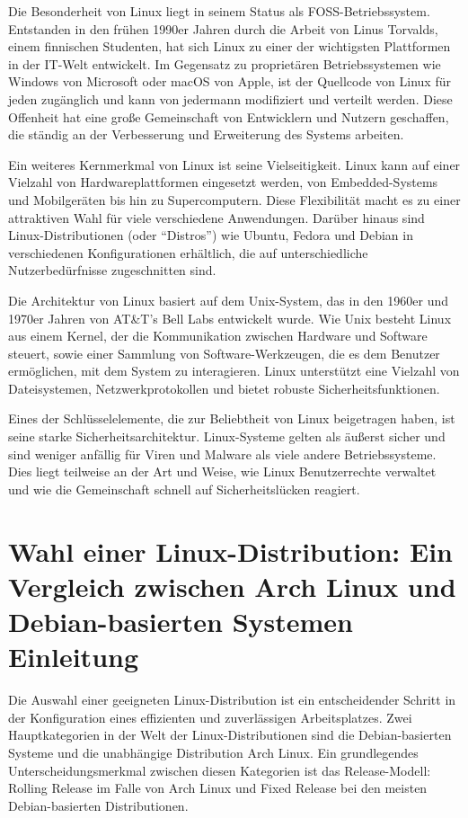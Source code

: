 Die Besonderheit von Linux liegt in seinem Status als
\Gls{FOSS}-Betriebssystem. Entstanden in den frühen 1990er Jahren durch die
Arbeit von Linus Torvalds, einem finnischen Studenten, hat sich Linux zu einer
der wichtigsten Plattformen in der IT-Welt entwickelt. Im Gegensatz zu
proprietären Betriebssystemen wie Windows von Microsoft oder macOS von Apple,
ist der Quellcode von Linux für jeden zugänglich und kann von jedermann
modifiziert und verteilt werden. Diese Offenheit hat eine große Gemeinschaft von
Entwicklern und Nutzern geschaffen, die ständig an der Verbesserung und
Erweiterung des Systems arbeiten.

Ein weiteres Kernmerkmal von Linux ist seine Vielseitigkeit. Linux kann auf
einer Vielzahl von Hardwareplattformen eingesetzt werden, von \Glspl{Embedded-System}
und Mobilgeräten bis hin zu Supercomputern. Diese Flexibilität macht es zu einer
attraktiven Wahl für viele verschiedene Anwendungen. Darüber hinaus sind
Linux-Distributionen (oder ``Distros'') wie Ubuntu, Fedora und Debian in
verschiedenen Konfigurationen erhältlich, die auf unterschiedliche
Nutzerbedürfnisse zugeschnitten sind.

Die Architektur von Linux basiert auf dem Unix-System, das in den 1960er und
1970er Jahren von AT\&T's Bell Labs entwickelt wurde. Wie Unix besteht Linux aus
einem Kernel, der die Kommunikation zwischen Hardware und Software steuert,
sowie einer Sammlung von Software-Werkzeugen, die es dem Benutzer ermöglichen,
mit dem System zu interagieren. Linux unterstützt eine Vielzahl von
Dateisystemen, Netzwerkprotokollen und bietet robuste Sicherheitsfunktionen.

Eines der Schlüsselelemente, die zur Beliebtheit von Linux beigetragen haben,
ist seine starke Sicherheitsarchitektur. Linux-Systeme gelten als äußerst sicher
und sind weniger anfällig für Viren und Malware als viele andere Betriebssysteme.
Dies liegt teilweise an der Art und Weise, wie Linux Benutzerrechte verwaltet
und wie die Gemeinschaft schnell auf Sicherheitslücken reagiert.

\newpage

\section{Wahl einer Linux-Distribution: Ein Vergleich zwischen Arch Linux und
Debian-basierten Systemen Einleitung}


Die Auswahl einer geeigneten Linux-Distribution ist ein entscheidender Schritt
in der Konfiguration eines effizienten und zuverlässigen Arbeitsplatzes. Zwei
Hauptkategorien in der Welt der Linux-Distributionen sind die Debian-basierten
Systeme und die unabhängige Distribution Arch Linux. Ein grundlegendes
Unterscheidungsmerkmal zwischen diesen Kategorien ist das Release-Modell:
Rolling Release im Falle von Arch Linux und Fixed Release bei den meisten
Debian-basierten Distributionen.

